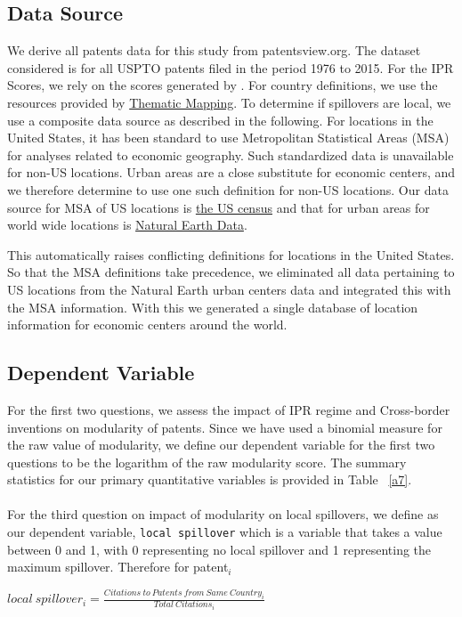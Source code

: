 \documentclass[12pt]{article}
\begin{document}
\subsection{Data Source}
We derive all patents data for this study from patentsview.org. The dataset considered is for all USPTO patents filed in the period 1976 to 2015. For the IPR Scores, we rely on the scores generated by \cite{Lesser2010}. For country definitions, we use the resources provided by \href{http://thematicmapping.org/downloads/world_borders.php}{Thematic Mapping}. To determine if spillovers are local, we use a composite data source as described in the following. For locations in the United States, it has been standard to use Metropolitan Statistical Areas (MSA) for analyses related to economic geography. Such standardized data is unavailable for non-US locations. Urban areas are a close substitute for  economic centers, and we therefore determine to use one such definition for non-US locations. Our data source for MSA of US locations is \href{http://www.census.gov/geo/maps-data/data/cbf/cbf_msa.html}{the US census} and that for urban areas for world wide locations is \href{http://www.naturalearthdata.com/downloads/10m-cultural-vectors/}{Natural Earth Data}.
 
This automatically raises conflicting definitions for locations in the United States. So that the MSA definitions take precedence, we eliminated all data pertaining to US locations from the Natural Earth urban centers data and integrated this with the MSA information. With this we  generated a single database of location information for economic centers around the world. 

\subsection{Dependent Variable}
For the first two questions, we assess the impact of IPR regime and Cross-border inventions on modularity of patents. Since we have used a binomial measure for the raw value of modularity, we define our dependent variable for the first two questions to be the logarithm of the raw modularity score. The summary statistics for our primary quantitative variables is provided in Table ~\ref{a7}. 
\\\\
For the third question on impact of modularity on local spillovers,  we define as our dependent variable, \verb|local spillover| which is a variable that takes a value between 0 and 1, with 0 representing no local spillover and 1 representing the maximum spillover. Therefore for patent$_i$
\begin{center} $ local\ spillover_i = \frac{Citations\ to\ Patents\ from\ Same\ Country_i}{Total\ Citations_i}$\end{center}

\end{document}

